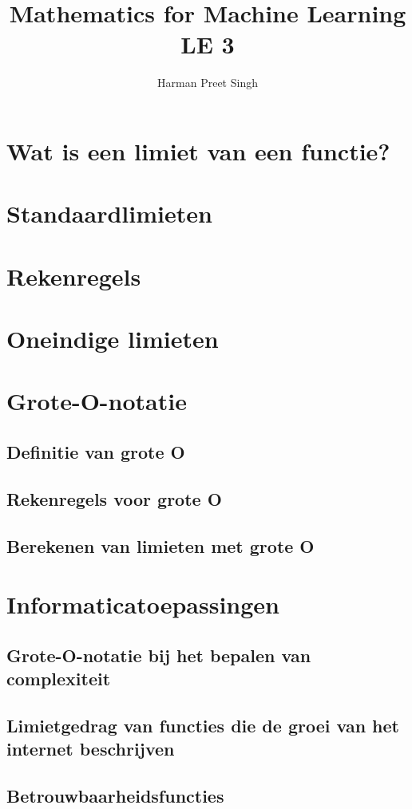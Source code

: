 \documentclass[a4paper, 12pt]{article}
\title{Mathematics for Machine Learning \textemdash{} LE 3}
\author{Harman Preet Singh}
\begin{document}

\maketitle
\tableofcontents

\section{Wat is een limiet van een functie?}
\section{Standaardlimieten}
\section{Rekenregels}
\section{Oneindige limieten}

\section{Grote-O-notatie}
\subsection{Definitie van grote O}
\subsection{Rekenregels voor grote O}
\subsection{Berekenen van limieten met grote O}

\section{Informaticatoepassingen}
\subsection{Grote-O-notatie bij het bepalen van complexiteit}
\subsection{Limietgedrag van functies die de groei van het internet beschrijven}
\subsection{Betrouwbaarheidsfuncties}
\end{document}
